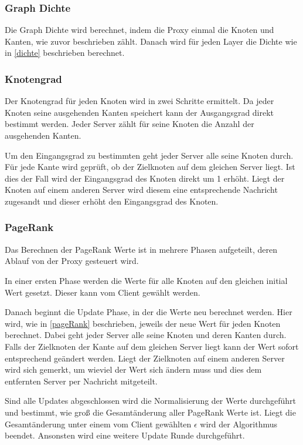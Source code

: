 \subsubsection{Graph Dichte}

Die Graph Dichte wird berechnet, indem die Proxy einmal die Knoten und Kanten, wie zuvor beschrieben zählt.
Danach wird für jeden Layer die Dichte wie in \ref{dichte} beschrieben berechnet.


\subsubsection{Knotengrad}

Der Knotengrad für jeden Knoten wird in zwei Schritte ermittelt.
Da jeder Knoten seine ausgehenden Kanten speichert kann der Ausgangsgrad direkt bestimmt werden. Jeder Server zählt für seine Knoten die Anzahl der ausgehenden Kanten.

Um den Eingangsgrad zu bestimmten geht jeder Server alle seine Knoten durch. Für jede Kante wird geprüft, ob der Zielknoten auf dem gleichen Server liegt. Ist dies der Fall wird der Eingangsgrad des Knoten direkt um 1 erhöht.
Liegt der Knoten auf einem anderen Server wird diesem eine entsprechende Nachricht zugesandt und dieser erhöht den Eingangsgrad des Knoten.


\subsubsection{PageRank}

Das Berechnen der PageRank Werte ist in mehrere Phasen aufgeteilt, deren Ablauf von der Proxy gesteuert wird.

In einer ersten Phase werden die Werte für alle Knoten auf den gleichen initial Wert gesetzt. Dieser kann vom Client gewählt werden.

Danach beginnt die Update Phase, in der die Werte neu berechnet werden. Hier wird, wie in \ref{pageRank} beschrieben, jeweils der neue Wert für jeden Knoten berechnet.
Dabei geht jeder Server alle seine Knoten und deren Kanten durch. Falls der Zielknoten der Kante auf dem gleichen Server liegt kann der Wert sofort entsprechend geändert werden.
Liegt der Zielknoten auf einem anderen Server wird sich gemerkt, um wieviel der Wert sich ändern muss und dies dem entfernten Server per Nachricht mitgeteilt.


Sind alle Updates abgeschlossen wird die Normalisierung der Werte durchgeführt und bestimmt, wie groß die Gesamtänderung aller PageRank Werte ist.
Liegt die Gesamtänderung unter einem vom Client gewählten $\epsilon$ wird der Algorithmus beendet. Ansonsten wird eine weitere Update Runde durchgeführt.


